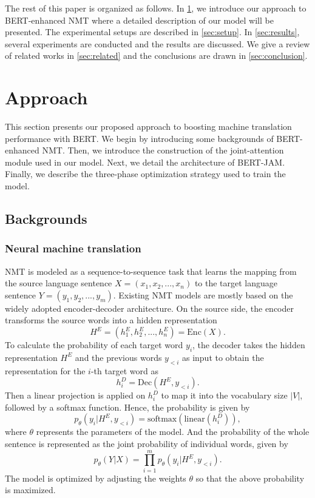 \documentclass[review]{elsarticle}
\begin{document}
The rest of this paper is organized as follows. 
In \cref{sec:approach}, we introduce our approach to BERT-enhanced NMT where a detailed description of our model will be presented. 
The experimental setups are described in \cref{sec:setup}. 
In \cref{sec:results}, several experiments are conducted and the results are discussed. 
We give a review of related works in \cref{sec:related} and the conclusions are drawn in \cref{sec:conclusion}.


\section{Approach}
\label{sec:approach}
This section presents our proposed approach to boosting machine translation performance with BERT. We begin by introducing some backgrounds of BERT-enhanced NMT. Then, we introduce the construction of the joint-attention module used in our model. Next, we detail the architecture of BERT-JAM. Finally, we describe the three-phase optimization strategy used to train the model.


\subsection{Backgrounds}
\label{ssec:background}

\subsubsection{Neural machine translation}
NMT is modeled as a sequence-to-sequence task that learns the mapping from the source language sentence $X=(x_1, x_2, ..., x_n)$ to the target language sentence $Y=(y_1, y_2, ..., y_m)$.
Existing NMT models are mostly based on the widely adopted encoder-decoder architecture. On the source side, the encoder transforms the source words into a hidden representation
\begin{equation}
    H^E=(h_1^E, h_2^E, ..., h_n^E)=\text{Enc}(X).    
\end{equation}
To calculate the probability of each target word $y_i$, the decoder takes the hidden representation $H^E$ and the previous words $y_{<i}$ as input to obtain the representation for the $i$-th target word as
\begin{equation}
    \label{eq:back_dec}
    h_i^D=\text{Dec}(H^E, y_{<i}).    
\end{equation}
Then a linear projection is applied on $h_i^D$ to map it into the vocabulary size $|V|$, followed by a softmax function. Hence, the probability is given by
\begin{equation}
    \label{eq:back_prob}
    p_{\theta}\left(y_i|H^E, y_{<i}\right)=\text{softmax}(\text{linear}(h_i^D)),
\end{equation}
where $\theta$ represents the parameters of the model. And the probability of the whole sentence is represented as the joint probability of individual words, given by
\begin{equation}
    \label{eq:back_joint_prob}
    p_{\theta}(Y|X)=\prod_{i=1}^m p_{\theta}\left(y_i|H^E, y_{<i}\right).
\end{equation}
The model is optimized by adjusting the weights $\theta$ so that the above probability is maximized.
\end{document}
